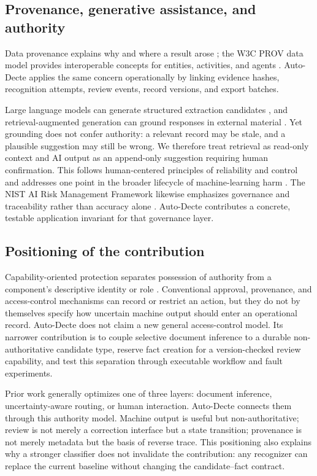 \subsection{Provenance, generative assistance, and authority}
Data provenance explains why and where a result arose \citep{buneman2001,herschel2017}; the W3C PROV data model provides interoperable concepts for entities, activities, and agents \citep{w3cprov}. Auto-Decte applies the same concern operationally by linking evidence hashes, recognition attempts, review events, record versions, and export batches.

Large language models can generate structured extraction candidates \citep{xu2024}, and retrieval-augmented generation can ground responses in external material \citep{gao2023}. Yet grounding does not confer authority: a relevant record may be stale, and a plausible suggestion may still be wrong. We therefore treat retrieval as read-only context and AI output as an append-only suggestion requiring human confirmation. This follows human-centered principles of reliability and control \citep{shneiderman2020} and addresses one point in the broader lifecycle of machine-learning harm \citep{suresh2021}. The NIST AI Risk Management Framework likewise emphasizes governance and traceability rather than accuracy alone \citep{nist2023}. Auto-Decte contributes a concrete, testable application invariant for that governance layer.

\subsection{Positioning of the contribution}
Capability-oriented protection separates possession of authority from a component's descriptive identity or role \citep{dennis1966}. Conventional approval, provenance, and access-control mechanisms can record or restrict an action, but they do not by themselves specify how uncertain machine output should enter an operational record. Auto-Decte does not claim a new general access-control model. Its narrower contribution is to couple selective document inference to a durable non-authoritative candidate type, reserve fact creation for a version-checked review capability, and test this separation through executable workflow and fault experiments.

Prior work generally optimizes one of three layers: document inference, uncertainty-aware routing, or human interaction. Auto-Decte connects them through this authority model. Machine output is useful but non-authoritative; review is not merely a correction interface but a state transition; provenance is not merely metadata but the basis of reverse trace. This positioning also explains why a stronger classifier does not invalidate the contribution: any recognizer can replace the current baseline without changing the candidate--fact contract.

